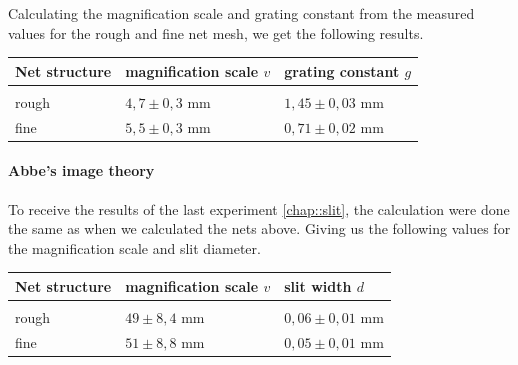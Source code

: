Calculating the magnification scale and grating constant from the measured values for the rough and fine net mesh, we get the following results.

\begin{tabularx}{\textwidth}{XM{5cm}M{5cm}}%
	\toprule 
	Net structure&magnification scale $v$ & grating constant $g$\\
	\hline
	&&\\[-5pt]
	rough	& $4,7\pm 0,3$ \si{\milli \m} & $1,45 \pm 0,03$ \si{\milli \m}	\\
	fine	& $5,5\pm 0,3$ \si{\milli \m} & $0,71 \pm 0,02$ \si{\milli \m}	\\	
	\bottomrule 
\end{tabularx}


\paragraph{Abbe's image theory}
To receive the results of the last experiment \ref{chap::slit}, the calculation were done the same as when we calculated the nets above. 
Giving us the following values for the magnification scale and slit diameter.

\begin{tabularx}{\textwidth}{XM{5cm}M{5cm}}%
	\toprule 
	Net structure&magnification scale $v$ & slit width $d$\\
	\hline
	&&\\[-5pt]
	rough	& $49\pm 8,4$ \si{\milli \m} & $0,06 \pm 0,01$ \si{\milli \m}	\\
	fine	& $51\pm 8,8$ \si{\milli \m} & $0,05 \pm 0,01$ \si{\milli \m}	\\	
	\bottomrule 
\end{tabularx}










